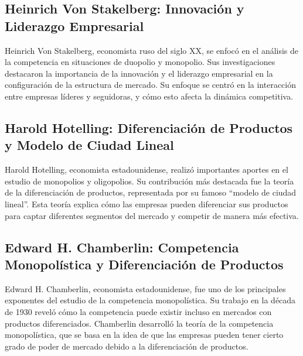 \documentclass[
  a4paper,
]{article}
\begin{document}
\hypertarget{heinrich-von-stakelberg-innovaciuxf3n-y-liderazgo-empresarial}{%
\subsection{Heinrich Von Stakelberg: Innovación y Liderazgo
Empresarial}\label{heinrich-von-stakelberg-innovaciuxf3n-y-liderazgo-empresarial}}

Heinrich Von Stakelberg, economista ruso del siglo XX, se enfocó en el
análisis de la competencia en situaciones de duopolio y monopolio. Sus
investigaciones destacaron la importancia de la innovación y el
liderazgo empresarial en la configuración de la estructura de mercado.
Su enfoque se centró en la interacción entre empresas líderes y
seguidoras, y cómo esto afecta la dinámica competitiva.

\hypertarget{harold-hotelling-diferenciaciuxf3n-de-productos-y-modelo-de-ciudad-lineal}{%
\subsection{Harold Hotelling: Diferenciación de Productos y Modelo de
Ciudad
Lineal}\label{harold-hotelling-diferenciaciuxf3n-de-productos-y-modelo-de-ciudad-lineal}}

Harold Hotelling, economista estadounidense, realizó importantes aportes
en el estudio de monopolios y oligopolios. Su contribución más destacada
fue la teoría de la diferenciación de productos, representada por su
famoso ``modelo de ciudad lineal''. Esta teoría explica cómo las
empresas pueden diferenciar sus productos para captar diferentes
segmentos del mercado y competir de manera más efectiva.

\hypertarget{edward-h.-chamberlin-competencia-monopoluxedstica-y-diferenciaciuxf3n-de-productos}{%
\subsection{Edward H. Chamberlin: Competencia Monopolística y
Diferenciación de
Productos}\label{edward-h.-chamberlin-competencia-monopoluxedstica-y-diferenciaciuxf3n-de-productos}}

Edward H. Chamberlin, economista estadounidense, fue uno de los
principales exponentes del estudio de la competencia monopolística. Su
trabajo en la década de 1930 reveló cómo la competencia puede existir
incluso en mercados con productos diferenciados. Chamberlin desarrolló
la teoría de la competencia monopolística, que se basa en la idea de que
las empresas pueden tener cierto grado de poder de mercado debido a la
diferenciación de productos.
\end{document}
